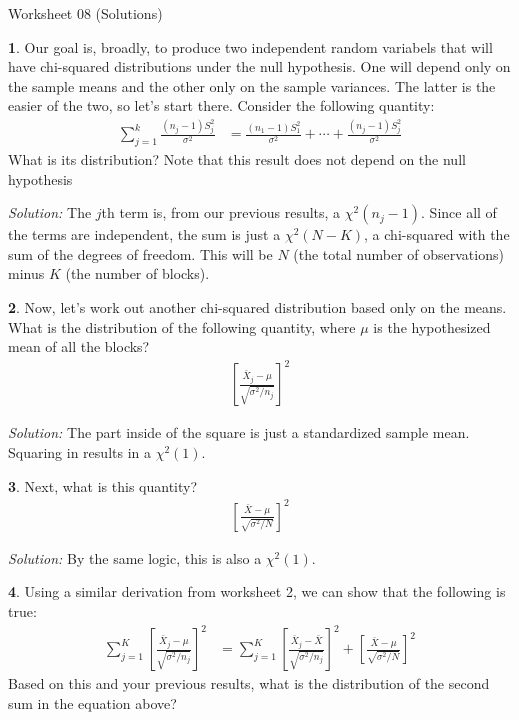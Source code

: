 \documentclass{tufte-handout}
\begin{document}
\justify

{\LARGE Worksheet 08 (Solutions)}

\vspace*{18pt}


\textbf{1}. Our goal is, broadly, to produce two independent random variabels that will have
chi-squared distributions under the null hypothesis. One will depend only on
the sample means and the other only on the sample variances. The latter is the
easier of the two, so let's start there. Consider the following quantity:
\begin{align*}
\sum_{j=1}^k \frac{(n_j - 1) S_j^2}{\sigma^2} &= \frac{(n_1 - 1) S_1^2}{\sigma^2} + \cdots + \frac{(n_j - 1) S_j^2}{\sigma^2}
\end{align*}
What is its distribution? Note that this result does not depend on the null
hypothesis

\textit{Solution:} The $j$th term is, from our previous results, a $\chi^2(n_j - 1)$. Since all
of the terms are independent, the sum is just a $\chi^2(N - K)$, a chi-squared
with the sum of the degrees of freedom. This will be $N$ (the total number of
observations) minus $K$ (the number of blocks).

\textbf{2}. Now, let's work out another chi-squared distribution based only on the means.
What is the distribution of the following quantity, where $\mu$ is the
hypothesized mean of all the blocks?
\begin{align*}
\left[\frac{\bar{X}_j - \mu}{\sqrt{\sigma^2 / n_j}}\right]^2
\end{align*} 

\textit{Solution:} The part inside of the square is just a standardized sample mean. Squaring
in results in a $\chi^2(1)$.

\textbf{3}. Next, what is this quantity?
\begin{align*}
\left[\frac{\bar{X} - \mu}{\sqrt{\sigma^2 / N}}\right]^2
\end{align*} 

\textit{Solution:} By the same logic, this is also a $\chi^2(1)$.

\textbf{4}. Using a similar derivation from worksheet 2, we can show that the following
is true:
\begin{align*}
\sum_{j=1}^K \left[\frac{\bar{X}_j - \mu}{\sqrt{\sigma^2 / n_j}}\right]^2 &=
\sum_{j=1}^K \left[\frac{\bar{X}_j - \bar{X}}{\sqrt{\sigma^2 / n_j}}\right]^2 +
\left[\frac{\bar{X} - \mu}{\sqrt{\sigma^2 / N}}\right]^2
\end{align*} 
Based on this and your previous results, what is the distribution of the 
second sum in the equation above?
\end{document}
